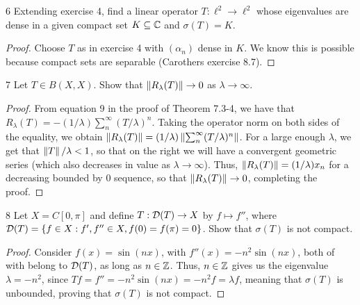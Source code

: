 \begin{exercise}{6}
Extending exercise 4, find a linear operator $T: \ell^2 \to \ell^2$ whose eigenvalues are dense in a given compact set $K \subseteq \mathbb{C}$ and $\sigma(T) = K$.
\end{exercise}
\begin{proof}
Choose $T$ as in exercise 4 with $(\alpha_n)$ dense in $K$.
We know this is possible because compact sets are separable (Carothers exercise 8.7).
\end{proof} 

\begin{exercise}{7}
Let $T \in B(X, X)$.
Show that $\left\lVert R_\lambda(T)\right\rVert \to 0$ as $\lambda \to \infty$.
\end{exercise}
\begin{proof}
From equation 9 in the proof of Theorem 7.3-4, we have that $R_\lambda (T) = -(1 / \lambda) \sum_n^\infty (T / \lambda)^n$.
Taking the operator norm on both sides of the equality, we obtain $\left\lVert R_\lambda (T)\right\rVert = (1 / \lambda) \left\lVert \sum_n^\infty (T / \lambda)^n\right\rVert$.
For a large enough $\lambda$, we get that $\left\lVert T\right\rVert/\lambda < 1$, so that on the right we will have a convergent geometric series (which also decreases in value as $\lambda \to \infty$).
Thus, $\left\lVert R_\lambda (T)\right\rVert = (1 / \lambda) x_n$ for a decreasing bounded by 0 sequence, so that $\left\lVert R_\lambda (T)\right\rVert \to 0$, completing the proof.
\end{proof} 

\begin{exercise}{8}
Let $X = C[0, \pi]$ and define $T: \mathcal{D}(T) \to X$ by $f \mapsto f''$, where $\mathcal{D}(T) = \{f \in X: f', f'' \in X, f(0) = f(\pi) = 0\}$.
Show that $\sigma(T)$ is not compact.
\end{exercise}
\begin{proof}
Consider $f(x) = \sin (n x)$, with $f''(x) = -n^2 \sin (n x)$, both of with belong to $\mathcal{D}(T)$, as long as $n \in \mathbb{Z}$.
Thus, $n \in \mathbb{Z}$ gives us the eigenvalue $\lambda = -n^2$, since $T f = f'' = -n^2 \sin (n x) = -n^2 f = \lambda f$, meaning that $\sigma(T)$ is unbounded, proving that $\sigma(T)$ is not compact.
\end{proof} 

